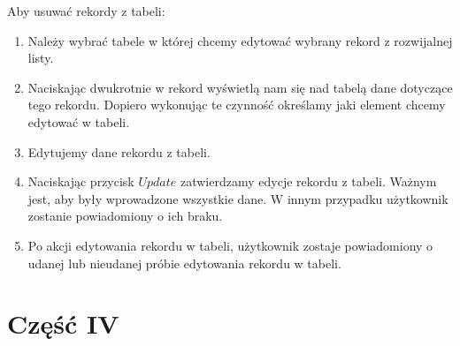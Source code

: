\documentclass[12pt,a4paper]{article}
\begin{document}
    Aby usuwać rekordy z tabeli:
    \begin{enumerate}
        \item Należy wybrać tabele w której chcemy edytować wybrany rekord z rozwijalnej listy.
        \item Naciskając dwukrotnie w rekord wyświetlą nam się nad tabelą dane dotyczące tego rekordu. Dopiero wykonując te czynność określamy jaki element chcemy edytować w tabeli.
        \item Edytujemy dane rekordu z tabeli. 
        \item Naciskając przycisk $Update$ zatwierdzamy edycje rekordu z tabeli. Ważnym jest, aby były wprowadzone wszystkie dane. W innym przypadku użytkownik zostanie powiadomiony o ich braku.
        \item Po akcji edytowania rekordu w tabeli, użytkownik zostaje powiadomiony o udanej lub nieudanej próbie edytowania rekordu w tabeli.
    \end{enumerate}
    
    \newpage
    \section{Część IV}
\end{document}
